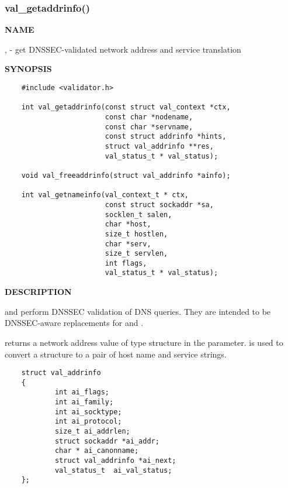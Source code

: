 \clearpage

\subsubsection{val\_getaddrinfo()}

{\bf NAME}

,  -
get DNSSEC-validated network address and service translation

{\bf SYNOPSIS}

\begin{verbatim}
    #include <validator.h>

    int val_getaddrinfo(const struct val_context *ctx,
                        const char *nodename,
                        const char *servname,
                        const struct addrinfo *hints,
                        struct val_addrinfo **res,
                        val_status_t * val_status);

    void val_freeaddrinfo(struct val_addrinfo *ainfo);

    int val_getnameinfo(val_context_t * ctx,
                        const struct sockaddr *sa,
                        socklen_t salen,
                        char *host,
                        size_t hostlen,
                        char *serv,
                        size_t servlen,
                        int flags, 
                        val_status_t * val_status);

\end{verbatim}

{\bf DESCRIPTION}

 and  perform DNSSEC
validation of DNS queries.  They are intended to be DNSSEC-aware replacements
for  and .

 returns a network address value of type
 structure in the  parameter.
 is used to convert a  structure
to a pair of host name and service strings.

\begin{verbatim}
    struct val_addrinfo
    {
            int ai_flags;
            int ai_family;
            int ai_socktype;
            int ai_protocol;
            size_t ai_addrlen;
            struct sockaddr *ai_addr;
            char * ai_canonname;
            struct val_addrinfo *ai_next;
            val_status_t  ai_val_status;
    };
\end{verbatim}

